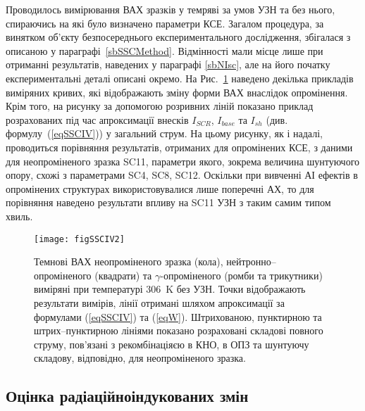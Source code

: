 Проводилось вимірювання ВАХ зразків у темряві за умов УЗН та без нього, спираючись на які було визначено параметри КСЕ.
Загалом процедура, за винятком об'єкту безпосереднього експериментального дослідження,
збігалася з описаною у параграфі~\ref{sbSSCMethod}.
Відмінності мали місце лише при отриманні результатів, наведених у параграфі \ref{sbNIsc},
але на його початку експериментальні деталі описані окремо.
На Рис.~\ref{figSSCIV2} наведено декілька прикладів виміряних кривих, які відображають
зміну форми ВАХ внаслідок опромінення.
Крім того, на рисунку за допомогою розривних ліній показано приклад розрахованих під час апроксимації внесків $I_{SCR}$, $I_{base}$ та $I_{sh}$
(див. формулу~(\ref{eqSSCIV})) у загальний струм.
На цьому рисунку, як і надалі, проводиться порівняння результатів,
отриманих для опромінених КСЕ, з даними для неопроміненого зразка SC11, параметри якого, зокрема величина шунтуючого опору,
схожі з параметрами SC4, SC8, SC12.
Оскільки при вивченні АІ ефектів в опромінених структурах використовувалися лише поперечні АХ,
то для порівняння наведено результати впливу на SC11 УЗН з таким самим типом хвиль.

\begin{figure}
\center
\texttt{[image: figSSCIV2]}%
\caption{\label{figSSCIV2}
Темнові ВАХ неопроміненого зразка (кола), нейтронно--опроміненого (квадрати) та $\gamma$-опроміненого (ромби та трикутники) виміряні при температурі 306~K без УЗН.
Точки відображають результати вимірів, лінії отримані шляхом апроксимації за формулами (\ref{eqSSCIV}) та (\ref{eqW}).
Штрихованою, пунктирною та штрих--пунктирною лініями показано розраховані складові повного струму, пов'язані з рекомбінаціяєю в КНО, в ОПЗ та шунтуючу складову, відповідно,
для неопроміненого зразка.
}%
\end{figure}



\subsection{Оцінка радіаційноіндукованих змін\label{sbRadDefCreate}}

